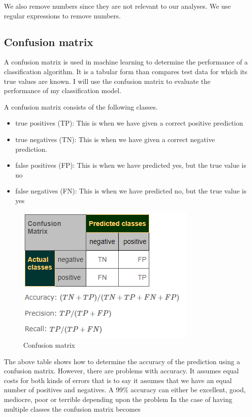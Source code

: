 We also remove numbers since they are not relevant to our analyses. We use regular expressions to remove numbers.




\subsection{Confusion matrix}
A confusion matrix is used in machine learning to determine the performance of a classification algorithm. It is a tabular form than compares test data for which its true values are known. I will use the confusion matrix to evaluate the performance of my classification model.

A confusion matrix consists of the following classes.
 \begin{itemize}

\item
true positives (TP): This is when we have given a correct positive prediction

\item
true negatives (TN): This is when we have given a correct negative prediction.

\item
false positives (FP): This is when we have predicted yes, but the true value is no

\item
false negatives (FN): This is when we have predicted no, but the true value is yes

\end{itemize}

\begin{figure}[h]
    \centering
    \includegraphics{images/confusion_matrix.png}
    \caption{Confusion matrix}
\end{figure}

  The above table shows how to determine the accuracy of the prediction using a confusion matrix. However, there are problems with accuracy. It assumes equal costs for both kinds of errors that is to say it assumes that we have an equal number of positives and negatives. A 99\% accuracy can either be excellent, good, mediocre, poor or terrible depending upon the problem
\clearpage
In the case of having multiple classes the confusion matrix becomes


